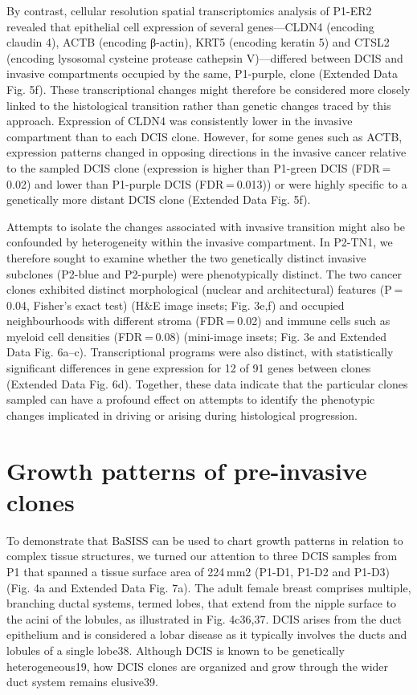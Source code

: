 By contrast, cellular resolution spatial transcriptomics analysis of P1-ER2 revealed that epithelial cell expression of several genes—CLDN4 (encoding claudin 4), ACTB (encoding β-actin), KRT5 (encoding keratin 5) and CTSL2 (encoding lysosomal cysteine protease cathepsin V)—differed between DCIS and invasive compartments occupied by the same, P1-purple, clone (Extended Data Fig. 5f). These transcriptional changes might therefore be considered more closely linked to the histological transition rather than genetic changes traced by this approach. Expression of CLDN4 was consistently lower in the invasive compartment than to each DCIS clone. However, for some genes such as ACTB, expression patterns changed in opposing directions in the invasive cancer relative to the sampled DCIS clone (expression is higher than P1-green DCIS (FDR = 0.02) and lower than P1-purple DCIS (FDR = 0.013)) or were highly specific to a genetically more distant DCIS clone (Extended Data Fig. 5f).

Attempts to isolate the changes associated with invasive transition might also be confounded by heterogeneity within the invasive compartment. In P2-TN1, we therefore sought to examine whether the two genetically distinct invasive subclones (P2-blue and P2-purple) were phenotypically distinct. The two cancer clones exhibited distinct morphological (nuclear and architectural) features (P = 0.04, Fisher’s exact test) (H\&E image insets; Fig. 3e,f) and occupied neighbourhoods with different stroma (FDR = 0.02) and immune cells such as myeloid cell densities (FDR = 0.08) (mini-image insets; Fig. 3e and Extended Data Fig. 6a–c). Transcriptional programs were also distinct, with statistically significant differences in gene expression for 12 of 91 genes between clones (Extended Data Fig. 6d). Together, these data indicate that the particular clones sampled can have a profound effect on attempts to identify the phenotypic changes implicated in driving or arising during histological progression.

\section{Growth patterns of pre-invasive clones}

To demonstrate that BaSISS can be used to chart growth patterns in relation to complex tissue structures, we turned our attention to three DCIS samples from P1 that spanned a tissue surface area of 224 mm2 (P1-D1, P1-D2 and P1-D3) (Fig. 4a and Extended Data Fig. 7a). The adult female breast comprises multiple, branching ductal systems, termed lobes, that extend from the nipple surface to the acini of the lobules, as illustrated in Fig. 4c36,37. DCIS arises from the duct epithelium and is considered a lobar disease as it typically involves the ducts and lobules of a single lobe38. Although DCIS is known to be genetically heterogeneous19, how DCIS clones are organized and grow through the wider duct system remains elusive39.


